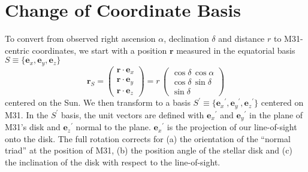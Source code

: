 \documentclass[preprint,12pt]{aastex}
\newcommand{\applabel}[1]{\label{app:#1}}
\newcommand{\bvec}[1]{\ensuremath{\boldsymbol{#1}}}
\renewcommand{\vector}[1]{\ensuremath{\bvec{#1}}}
\newcommand{\uvec}[1]{\ensuremath{\vector{e}_{#1}}}
\newcommand{\ex}{\uvec{x}}
\newcommand{\ey}{\uvec{y}}
\newcommand{\ez}{\uvec{z}}
\newcommand{\epx}{\ensuremath{\uvec{x}^\prime}}
\newcommand{\epy}{\ensuremath{\uvec{y}^\prime}}
\newcommand{\epz}{\ensuremath{\uvec{z}^\prime}}
\begin{document}
\section{Change of Coordinate Basis}

\applabel{coords}

To convert from observed right ascension $\alpha$, declination $\delta$ and
distance $r$ to M31-centric coordinates, we start with a position
$\vector{r}$ measured in the equatorial basis $S \equiv \{\ex,\ey,\ez\}$
\begin{equation}
    \vector{r}_S =
    \left ( \begin{array}{c}
        \vector{r} \cdot \ex \\
        \vector{r} \cdot \ey \\
        \vector{r} \cdot \ez
    \end{array} \right )
    = r \,\left ( \begin{array}{c}
        \cos \delta \, \cos \alpha \\
        \cos \delta \, \sin \delta \\
        \sin \delta
    \end{array} \right )
\end{equation}
centered on the Sun.  We then transform to a basis $S^\prime \equiv
\{\epx,\epy,\epz\}$
centered on M31. In the $S^\prime$ basis, the unit vectors are defined with
$\epx$ and $\epy$ in the plane of M31's disk and $\epz$ normal to the plane.
$\epx$ is the projection of our line-of-sight onto the disk. The full
rotation corrects for (a) the orientation of the ``normal triad'' at the
position of M31, (b) the position angle of the stellar disk and (c) the
inclination of the disk with respect to the line-of-sight.
\end{document}
